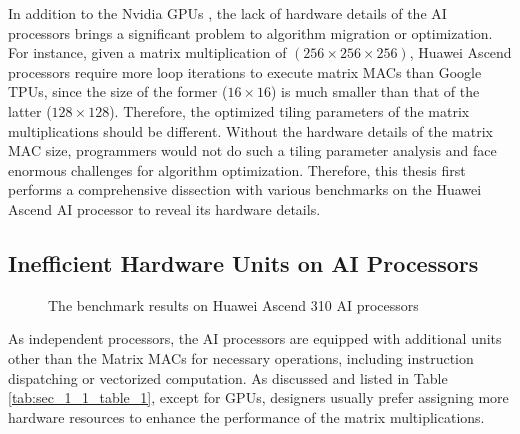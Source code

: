 In addition to the Nvidia GPUs \cite{DBLP:journals/corr/abs-1804-06826, DBLP:conf/ppopp/ZhangTXLZC17, DBLP:conf/ics/ZhouTZWS17, DBLP:conf/ispass/RaihanGA19, DBLP:conf/pldi/HongSKRKPRS18, DBLP:conf/cgo/ZhouMSM21}, the lack of hardware details of the AI processors brings a significant problem to algorithm migration or optimization. For instance, given a matrix multiplication of $(256 \times 256 \times 256)$, Huawei Ascend processors require more loop iterations to execute matrix MACs than Google TPUs, since the size of the former ($16 \times 16$) is much smaller than that of the latter ($128 \times 128$). Therefore, the optimized tiling parameters of the matrix multiplications should be different. Without the hardware details of the matrix MAC size, programmers would not do such a tiling parameter analysis and face enormous challenges for algorithm optimization. Therefore, this thesis first performs a comprehensive dissection with various benchmarks on the Huawei Ascend AI processor to reveal its hardware details.

\subsection{Inefficient Hardware Units on AI Processors \label{sec_1_2_2}}

\begin{figure}[tbp]
    \caption{The benchmark results on Huawei Ascend 310 AI processors}
    \label{fig:benchmark}
    \end{figure}

As independent processors, the AI processors are equipped with additional units other than the Matrix MACs for necessary operations, including instruction dispatching or vectorized computation. As discussed and listed in Table \ref{tab:sec_1_1_table_1}, except for GPUs, designers usually prefer assigning more hardware resources to enhance the performance of the matrix multiplications. 

